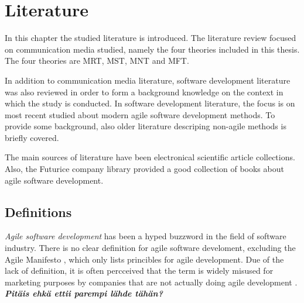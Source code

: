 \documentclass[english,12pt,a4paper,pdftex]{article}
\begin{document}
\thispagestyle{empty}


\clearpage

\section{Literature}

In this chapter the studied literature is introduced. The literature review focused on communication media studied, namely the four theories included in this thesis. The four theories are \ac{MRT}, \ac{MST}, \ac{MNT} and \ac{MFT}.

In addition to communication media literature, software development literature was also reviewed in order to form a background knowledge on the context in which the study is conducted. In software development literature, the focus is on most recent studied about modern agile software development methods. To provide some background, also older literature descriping non-agile methods is briefly covered.

The main sources of literature have been electronical scientific article collections. Also, the Futurice company library provided a good collection of books about agile software development.

\subsection{Definitions}

\emph{Agile software development} has been a hyped buzzword in the field of software industry. There is no clear definition for agile software develoment, excluding the Agile Manifesto \citep{agilemanifesto}, which only lists princibles for agile development. Due of the lack of definition, it is often percceived that the term is widely misused for marketing purposes by companies that are not actually doing agile development \citep{signleton2012}. \textbf{\emph{Pitäis ehkä ettii parempi lähde tähän?}}
\end{document}
